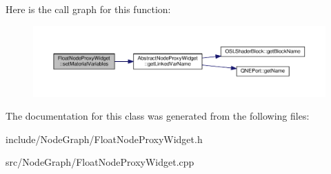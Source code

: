 Here is the call graph for this function\-:
\nopagebreak
\begin{figure}[H]
\begin{center}
\leavevmode
\includegraphics[width=350pt]{class_float_node_proxy_widget_af2534a2cae437c7b5c123d52315d0fbf_cgraph}
\end{center}
\end{figure}




The documentation for this class was generated from the following files\-:\begin{DoxyCompactItemize}
\item 
include/\-Node\-Graph/Float\-Node\-Proxy\-Widget.\-h\item 
src/\-Node\-Graph/Float\-Node\-Proxy\-Widget.\-cpp\end{DoxyCompactItemize}
